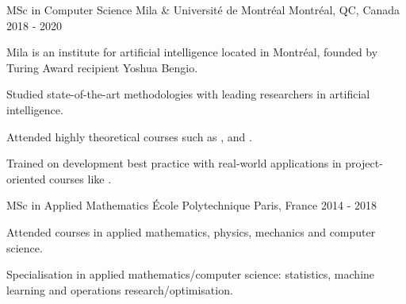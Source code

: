 \begin{cventries}
    \cventry
    {MSc in Computer Science} %
    {Mila \& Université de Montréal} %
    {Montréal, QC, Canada} %
    {2018 - 2020} %
    {
            Mila is an institute for artificial intelligence located in Montréal, founded by Turing Award recipient Yoshua Bengio.
        \vspace{5mm}
        \begin{cvitems}
            \item Studied state-of-the-art methodologies with leading researchers in artificial intelligence.
            \item Attended highly theoretical courses such as ,  and .
            \item Trained on development best practice with real-world applications in project-oriented courses like .
        \end{cvitems}
    }

    \cventry
    {MSc in Applied Mathematics} %
    {École Polytechnique} %
    {Paris, France} %
    {2014 - 2018} %
    {
        \begin{cvitems} %
        \item Attended courses in applied mathematics, physics, mechanics and computer science.
        \item Specialisation in applied mathematics/computer science: statistics, machine learning and operations research/optimisation.
      \end{cvitems}
    }


\end{cventries}
